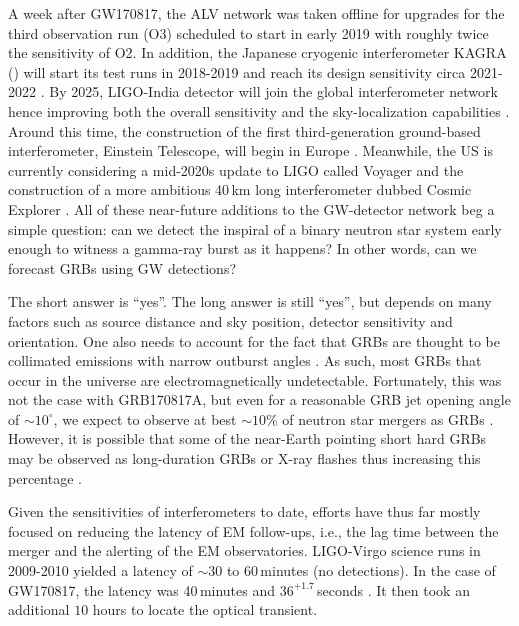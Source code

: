 \documentclass[prd,amsmath,amssymb,aps,floats,amsfonts,notitlepage,superscriptaddress,eqsecnum,nofootinbib,10pt]{revtex4-1}
\begin{document}
A week after GW170817, the ALV network was taken offline for upgrades for the third observation run (O3) 
scheduled to start in early 2019 with roughly twice the sensitivity of O2.
In addition, the Japanese cryogenic interferometer KAGRA (\cite{KAGRA, KAGRA2}) will start its test runs in 2018-2019 and reach its design sensitivity circa 2021-2022 \cite{Akutsu:2017thy, Aasi:2013wya}. By 2025, LIGO-India detector will join the global interferometer network hence improving both the overall sensitivity and the sky-localization capabilities \cite{Aasi:2013wya}.
Around this time, the construction of the first third-generation ground-based interferometer, Einstein Telescope, will begin in Europe \cite{ET_doc}. 
Meanwhile, the US is currently considering a mid-2020s update to LIGO called Voyager \cite{LIGO_Voy} and the construction of a more ambitious 40\,km long interferometer dubbed Cosmic Explorer \cite{CE}.
All of these near-future additions to the GW-detector network beg a simple question: can we detect the inspiral of a binary neutron star system
early enough to witness a gamma-ray burst as it happens? In other words, can we forecast GRBs using GW detections?

The short answer is ``yes''. The long answer is still ``yes'', but depends on many factors such as source distance and sky position, detector sensitivity and orientation. One also needs to account for the fact that GRBs are thought to be collimated emissions with narrow outburst angles \cite{Kumar:2014upa}.
As such, most GRBs that occur in the universe are electromagnetically undetectable. Fortunately, this was not the case with GRB170817A, 
but even for a reasonable GRB jet opening angle of $\sim 10^\circ$, we expect to observe at best $\sim 10\%$ of neutron star mergers as GRBs \cite{Patricelli:2016bkt}. 
However, it is possible that some of the near-Earth pointing short hard GRBs may be observed as long-duration GRBs or X-ray flashes thus increasing this percentage \cite{Bucciantini:2011kx}.

Given the sensitivities of interferometers to date, efforts have thus far mostly focused on reducing the latency of EM follow-ups, 
i.e., the lag time between the merger and the alerting of the EM observatories. 
LIGO-Virgo science runs in 2009-2010 yielded a latency of $\sim\!\! 30$ to $60\,$minutes \cite{Abbott:2011ys} (no detections).
In the case of GW170817, the latency was 40\,minutes and $36^{+1.7}\,$seconds \cite{GBM:2017lvd}.
It then took an additional $ 10$ hours to locate the optical transient. %
\end{document}
